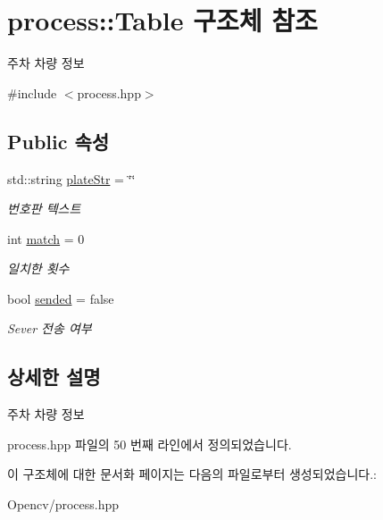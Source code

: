 \hypertarget{structprocess_1_1_table}{}\section{process\+:\+:Table 구조체 참조}
\label{structprocess_1_1_table}


주차 차량 정보  




{\ttfamily \#include $<$process.\+hpp$>$}

\subsection*{Public 속성}
\begin{DoxyCompactItemize}
\item 
\mbox{\label{structprocess_1_1_table_a5cffcdbe502a6165eb806b64ba27fbe0}} 
std\+::string \hyperlink{structprocess_1_1_table_a5cffcdbe502a6165eb806b64ba27fbe0}{plate\+Str} = \char`\"{}\char`\"{}
\begin{DoxyCompactList}\small\item\em 번호판 텍스트 \end{DoxyCompactList}\item 
\mbox{\label{structprocess_1_1_table_a930e1f2f75a47d337ad2fab346791c19}} 
int \hyperlink{structprocess_1_1_table_a930e1f2f75a47d337ad2fab346791c19}{match} = 0
\begin{DoxyCompactList}\small\item\em 일치한 횟수 \end{DoxyCompactList}\item 
\mbox{\label{structprocess_1_1_table_aefdb336dc1532718fcbf1708a35d9aff}} 
bool \hyperlink{structprocess_1_1_table_aefdb336dc1532718fcbf1708a35d9aff}{sended} = false
\begin{DoxyCompactList}\small\item\em Sever 전송 여부 \end{DoxyCompactList}\end{DoxyCompactItemize}


\subsection{상세한 설명}
주차 차량 정보 

process.\+hpp 파일의 50 번째 라인에서 정의되었습니다.



이 구조체에 대한 문서화 페이지는 다음의 파일로부터 생성되었습니다.\+:\begin{DoxyCompactItemize}
\item 
Opencv/process.\+hpp\end{DoxyCompactItemize}
